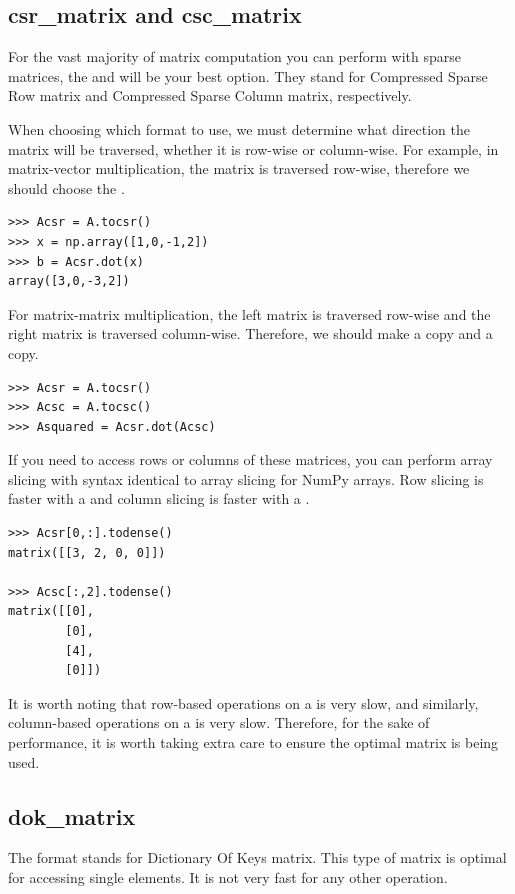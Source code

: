 \subsection*{csr\_matrix and csc\_matrix}
For the vast majority of matrix computation you can perform with sparse matrices, the
 and  will be your best option. They stand for
Compressed Sparse Row matrix and Compressed Sparse Column matrix, respectively.

When choosing which format to use, we must determine what direction the matrix
will be traversed, whether it is row-wise or column-wise. For example, in matrix-vector
multiplication, the matrix is traversed row-wise, therefore we should choose the
.

\begin{lstlisting}
>>> Acsr = A.tocsr()
>>> x = np.array([1,0,-1,2])
>>> b = Acsr.dot(x)
array([3,0,-3,2])
\end{lstlisting}

For matrix-matrix multiplication, the left matrix is traversed row-wise and the
right matrix is traversed column-wise. Therefore, we should make a 
copy and a  copy.

\begin{lstlisting}
>>> Acsr = A.tocsr()
>>> Acsc = A.tocsc()
>>> Asquared = Acsr.dot(Acsc)
\end{lstlisting}

If you need to access rows or columns of these matrices, you can perform array
slicing with syntax identical to array slicing for NumPy arrays. Row slicing is
faster with a  and column slicing is faster with a .

\begin{lstlisting}
>>> Acsr[0,:].todense()
matrix([[3, 2, 0, 0]])

>>> Acsc[:,2].todense()
matrix([[0],
        [0],
        [4],
        [0]])
\end{lstlisting}

It is worth noting that row-based operations on a  is very slow,
and similarly, column-based operations on a  is very slow. Therefore,
for the sake of performance, it is worth taking extra care to ensure the optimal
matrix is being used.

\subsection*{dok\_matrix}
The  format stands for Dictionary Of Keys matrix. This type of matrix
is optimal for accessing single elements. It is not very fast for any other operation.

